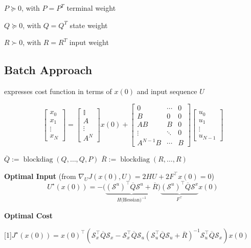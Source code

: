 $P\succeq0$, with $P=P^T$
terminal weight

$Q\succeq0$, with $Q = Q^T$
state weight

$R\succ0$, with $R = R^T$
input weight

\subsection{Batch Approach}

expresses cost function in terms of $x(0)$ and input sequence $U$

\[ \begin{bmatrix}
		x_0    \\
		x_1    \\
		\vdots \\
		x_N
	\end{bmatrix}
	=
	\begin{bmatrix}
		\mathbb{I} \\
		A          \\
		\vdots     \\
		A^N
	\end{bmatrix}
	x(0) +
	\begin{bmatrix}
		0        & \cdots & 0 \\
		B        & 0      & 0 \\
		AB       & B      & 0 \\
		\vdots   & \ddots & 0 \\
		A^{N-1}B & \cdots & B
	\end{bmatrix}
	\begin{bmatrix}
		u_0    \\
		u_1    \\
		\vdots \\
		u_{N-1}
	\end{bmatrix} \]


$\overline{Q} := \mathop{\mathrm{blockdiag}}(Q,\dots, Q,P)$
\quad
$\overline{R} := \mathop{\mathrm{blockdiag}}(R,\dots, R)$

\textbf{Optimal Input}
(from $\nabla_UJ(x(0),U)=2HU+2F^\top x(0)=0$)
\[ U^\star(x(0)) =
	- \bigl(
	\underbrace{
			(\mathcal{S}^u)^\top \overline{Q} \mathcal{S}^u + \overline{R}
		}_{H\text{(Hessian)}^{-1}}
	\bigr)
	\underbrace{
		(\mathcal{S}^u)^\top \overline{Q}\mathcal{S}^x
	}_ {F^\top}
	x(0)
\]


\textbf{Optimal Cost}

\scalebox{0.97}[1]{$
		\scriptstyle
		J^\star(x(0)) = x(0)^\top (
		\mathcal{S}_x^\top \overline{Q} \mathcal{S}_x
		- \mathcal{S}_x^\top \overline{Q} \mathcal{S}_u
		(\mathcal{S}_u^\top \overline{Q} \mathcal{S}_u
		+ \overline{R})^{-1}
		\mathcal{S}_u^\top \overline{Q} \mathcal{S}_x
		)x(0)$}

